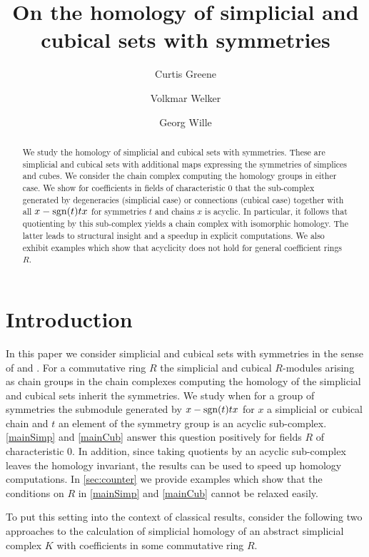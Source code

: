\documentclass[12pt]{amsart}
\author{Curtis Greene}
\author{Volkmar Welker}
\author{Georg Wille}
\title{On the homology of simplicial and cubical sets with symmetries}
\theoremstyle{plain}
\numberwithin{lemma}{\DefaultNumberTheoremWithin}
\numberwithin{claim}{\DefaultNumberTheoremWithin}
\numberwithin{theorem}{\DefaultNumberTheoremWithin}
\numberwithin{corollary}{\DefaultNumberTheoremWithin}
\numberwithin{proposition}{\DefaultNumberTheoremWithin}
\numberwithin{conjecture}{\DefaultNumberTheoremWithin}
\theoremstyle{definition}
\theoremstyle{definition}
\numberwithin{question}{\DefaultNumberTheoremWithin}
\theoremstyle{definition}
\numberwithin{problem}{\DefaultNumberTheoremWithin}
\theoremstyle{remark}
\numberwithin{remark}{\DefaultNumberTheoremWithin}
\theoremstyle{remark}
\numberwithin{example}{\DefaultNumberTheoremWithin}
\def\sgn{\textnormal{sgn}}
\begin{document}
\begin{abstract}
    We study the homology of simplicial and cubical sets with symmetries. These are simplicial and cubical sets with additional maps expressing the symmetries of simplices and cubes. We consider the chain complex computing the homology groups in either case. We show for coefficients in fields of characteristic $0$ that the sub-complex generated by degeneracies (simplicial case) or connections (cubical case) together with all $x - \sgn(t)tx$ for symmetries $t$ and chains $x$ is acyclic. In particular, it follows that quotienting by this sub-complex yields a chain complex with isomorphic homology. The latter leads to structural insight and a speedup in explicit computations. 
    We also exhibit examples which show that acyclicity does not hold for general coefficient rings $R$. 
\end{abstract}



\maketitle

\section{Introduction} \label{sec:intro}

In this paper we consider simplicial and cubical sets with symmetries
in the sense of \cite[p.58--59]{GodementBook} and
\cite{Grandis,Grandis09}. For a commutative ring $R$ the 
simplicial and cubical $R$-modules arising as chain groups in the chain 
complexes computing the homology of the simplicial and cubical sets 
inherit the symmetries. We study when for a group of
symmetries the submodule generated by $x - \sgn(t)tx$ for 
$x$ a simplicial or cubical chain and $t$ an element of the symmetry group is an acyclic sub-complex. \ref{mainSimp} and \ref{mainCub} answer this question
positively for fields $R$ of characteristic $0$. In addition, since taking quotients by an acyclic sub-complex leaves the homology invariant, the results can be used to speed up homology 
computations. 
In \ref{sec:counter} we provide examples which show that the conditions on $R$ in
\ref{mainSimp} and \ref{mainCub} cannot be relaxed easily. 

To put this setting into the context of 
classical results, consider the following two app\-roaches to the 
cal\-cu\-lation of simplicial homology of an abstract simplicial complex $K$ with coefficients in some com\-mutative ring $R$. 
\end{document}
